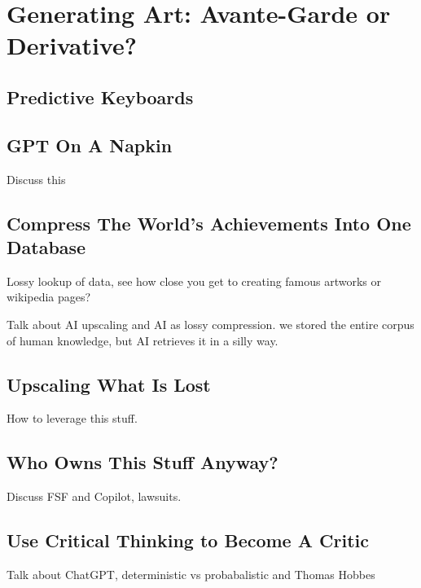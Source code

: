 \setchapterpreamble[u]{\margintoc}
\chapter{Generating Art: Avante-Garde or Derivative?}

\section{Predictive Keyboards}

\section{GPT On A Napkin}

Discuss this 

\section{Compress The World's Achievements Into One Database}

Lossy lookup of data, see how close you get to creating famous artworks or wikipedia pages?

Talk about AI upscaling and AI as lossy compression. we stored the entire corpus of human knowledge, but AI retrieves it in a silly way.

\section{Upscaling What Is Lost}

How to leverage this stuff.

\section{Who Owns This Stuff Anyway?}

Discuss FSF and Copilot, lawsuits.

\section{Use Critical Thinking to Become A Critic}

Talk about ChatGPT, deterministic vs probabalistic and Thomas Hobbes 


